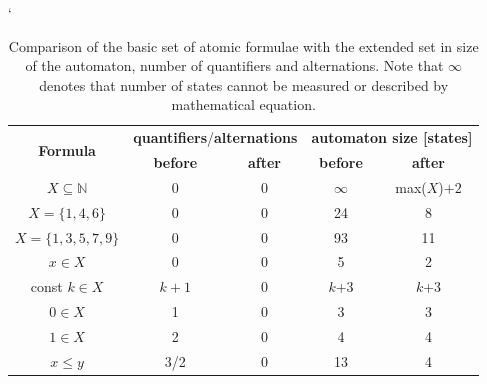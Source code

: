  \begin{table}
  \catcode`
 \begin{center}
  \begin{tabular}{|c|c|c|c|c|}
  \hline  
     \multirow{2}{*}{\textbf{Formula}}          
                    &\multicolumn{2}{c|}{\textbf{quantifiers}/\textbf{alternations}}&\multicolumn{2}{c|}{\textbf{automaton
                    size [states]}}\\
    \cline{2-5}
     & \textbf{before}     &    \textbf{after}    &
    \textbf{before}     &    \textbf{after}\\
    \hline
    \hline
    $X \subseteq \mathbb{N}$ & 0 & 0 & $\infty$ & max($X$)$ + 2$\\
    \hline
    $X = \{1, 4, 6\}$ & 0 & 0 & 24 & 8\\
    \hline
    $X = \{1, 3, 5, 7, 9\}$ & 0 & 0 & 93 & 11\\
    \hline
    \hline
    $x \in X$ & 0 & 0 & 5 & 2\\
    \hline
    const $k \in X$ & $k+1$ & 0 & $k$+3 & $k$+3\\
    \hline
    $0 \in X$ & 1 & 0 & 3 & 3\\
    \hline
    $1 \in X$ & 2 & 0 & 4 & 4\\
    \hline
    \hline
    $x \leq y$ & 3/2 & 0 & 13 & 4\\
    \hline
  \end{tabular}
 \end{center}
 \caption{Comparison of the basic set of atomic formulae with the extended set
 in size of the automaton, number of quantifiers and alternations. Note that $\infty$
 denotes that number of states cannot be measured or described by mathematical
 equation.}\label{atomic-formulae}
 \end{table}
 
